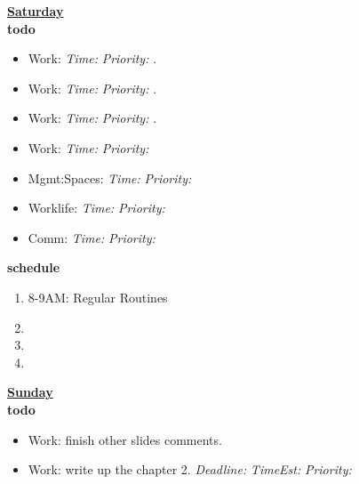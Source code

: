 \documentclass[11pt]{article}
\newcommand{\timeEst}[1]{\textit{Time:} \textit{#1}}
\newcommand{\te}[1]{\textit{TimeEst:} \textit{#1}}
\newcommand{\priority}[1]{\textit{Priority:} \textit{#1}}
\newcommand{\pr}[1]{\textit{Priority:} \textit{#1}}
\newcommand{\deadline}[1]{#1}
\newcommand{\dl}[1]{\textit{Deadline:}#1}
\begin{document}
{            \textbf{\small \underline{Saturday}} \\
            \textbf{\small todo} \\
            \begin{itemize} 
              \tiny \item \tiny Work:                                      \deadline{} \timeEst{} \priority{}. 
            \item \tiny Work:                                              \deadline{ }   \timeEst{}  \priority{}.
            \item \tiny Work:                                              \deadline{ }   \timeEst{}  \priority{}. 
            \item \tiny Work:                                              \deadline{} \timeEst{} \priority{} 
            \item \tiny Mgmt:Spaces:                                       \deadline{} \timeEst{} \priority{} 
            \item \tiny Worklife:                                          \deadline{} \timeEst{} \priority{} 
            \item \tiny Comm:                                              \deadline{} \timeEst{} \priority{} 
            \end{itemize} 
            \textbf{\small schedule} \\
            \begin{enumerate}
              \tiny \item \tiny 8-9AM: Regular Routines 
            \item \tiny 
            \item \tiny 
            \item \tiny   
            \end{enumerate} 

            \textbf{\small \underline{Sunday}} \\
            \textbf{\small todo} \\
            \begin{itemize} 
              \tiny \item \tiny Work: finish other slides comments. 
              \tiny \item \tiny Work: write up the chapter 2.  \dl{} \te{}  \pr{} 


\end{itemize}}
\end{document}
